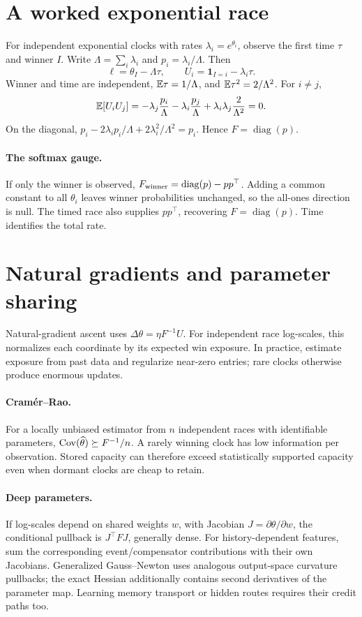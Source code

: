 \documentclass[11pt]{article}
\begin{document}
\section{A worked exponential race}
For independent exponential clocks with rates $\lambda_i=e^{\theta_i}$, observe the first time $\tau$ and winner $I$. Write $\Lambda=\sum_i\lambda_i$ and $p_i=\lambda_i/\Lambda$. Then
\[
 \ell=\theta_I-\Lambda\tau,\qquad U_i=\mathbf1_{I=i}-\lambda_i\tau.
\]
Winner and time are independent, $\mathbb{E}\tau=1/\Lambda$, and $\mathbb{E}\tau^2=2/\Lambda^2$. For $i\ne j$,
\[
 \mathbb{E}[U_iU_j]=-\lambda_j\frac{p_i}{\Lambda}
 -\lambda_i\frac{p_j}{\Lambda}
 +\lambda_i\lambda_j\frac2{\Lambda^2}=0.
\]
On the diagonal, $p_i-2\lambda_ip_i/\Lambda+2\lambda_i^2/\Lambda^2=p_i$. Hence $F=\operatorname{diag}(p)$.
\paragraph{The softmax gauge.} If only the winner is observed, $F_{\rm winner}=\operatorname{diag}(p)-pp^\top$. Adding a common constant to all $\theta_i$ leaves winner probabilities unchanged, so the all-ones direction is null. The timed race also supplies $pp^\top$, recovering $F=\operatorname{diag}(p)$. Time identifies the total rate.
\section{Natural gradients and parameter sharing}
Natural-gradient ascent uses $\Delta\theta=\eta F^{-1}U$. For independent race log-scales, this normalizes each coordinate by its expected win exposure. In practice, estimate exposure from past data and regularize near-zero entries; rare clocks otherwise produce enormous updates.
\paragraph{Cram\'er--Rao.} For a locally unbiased estimator from $n$ independent races with identifiable parameters, $\operatorname{Cov}(\widehat\theta)\succeq F^{-1}/n$. A rarely winning clock has low information per observation. Stored capacity can therefore exceed statistically supported capacity even when dormant clocks are cheap to retain.
\paragraph{Deep parameters.} If log-scales depend on shared weights $w$, with Jacobian $J=\partial\theta/\partial w$, the conditional pullback is $J^\top FJ$, generally dense. For history-dependent features, sum the corresponding event/compensator contributions with their own Jacobians. Generalized Gauss--Newton uses analogous output-space curvature pullbacks; the exact Hessian additionally contains second derivatives of the parameter map. Learning memory transport or hidden routes requires their credit paths too.
\end{document}
